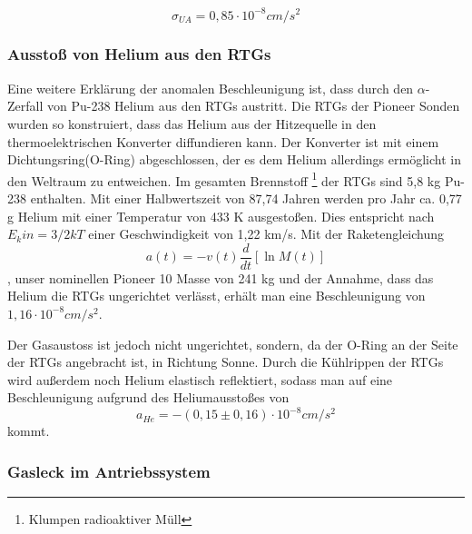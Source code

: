 \begin{equation}
\sigma _{\mathit{UA}}=0,85\cdot 10^{-8}\mathit{cm}/s^{2}
\end{equation}


\bigskip

\subsubsection{ Aussto{\ss} von Helium aus den RTGs}

Eine weitere Erkl\"arung der anomalen Beschleunigung ist, dass durch den
$\alpha ${}-Zerfall von Pu-238 Helium aus den RTGs austritt. Die RTGs
der Pioneer Sonden wurden so konstruiert, dass das Helium aus der
Hitzequelle in den thermoelektrischen Konverter diffundieren kann. Der
Konverter ist mit einem Dichtungsring(O-Ring) abgeschlossen, der es dem Helium
allerdings erm\"oglicht in den Weltraum zu entweichen. Im gesamten Brennstoff \footnote{Klumpen radioaktiver Müll} der RTGs sind 5,8 kg Pu-238 enthalten\cite{Anderson2002}. Mit einer
Halbwertszeit von 87,74 Jahren werden pro Jahr ca. 0,77 g Helium mit einer
Temperatur von 433 K ausgesto{\ss}en. Dies entspricht nach $E_kin=3/2 kT$ einer
Geschwindigkeit von 1,22 km/s. Mit der Raketengleichung
\begin{equation}
a(t)=-v(t)\frac{d}{\mathit{dt}}[\ln M(t)]
\end{equation},
unser nominellen Pioneer 10 Masse von 241 kg und der Annahme, dass das
Helium die RTGs ungerichtet verl\"asst, erh\"alt man eine
Beschleunigung von $1,16\cdot 10^{-8}\mathit{cm}/s^{2}$.

Der Gasaustoss ist jedoch nicht ungerichtet, sondern, da der O-Ring an
der Seite der RTGs angebracht ist, in Richtung Sonne. Durch die
K\"uhlrippen der RTGs wird au{\ss}erdem noch Helium elastisch
reflektiert, sodass man auf eine Beschleunigung aufgrund des
Heliumaussto{\ss}es von
\begin{equation}
a_{\mathit{He}}=-(0,15\pm 0,16)\cdot 10^{-8}\mathit{cm}/s^{2}
\end{equation}
kommt\cite{Anderson2002}.


\bigskip

\subsubsection{Gasleck im Antriebssystem}

